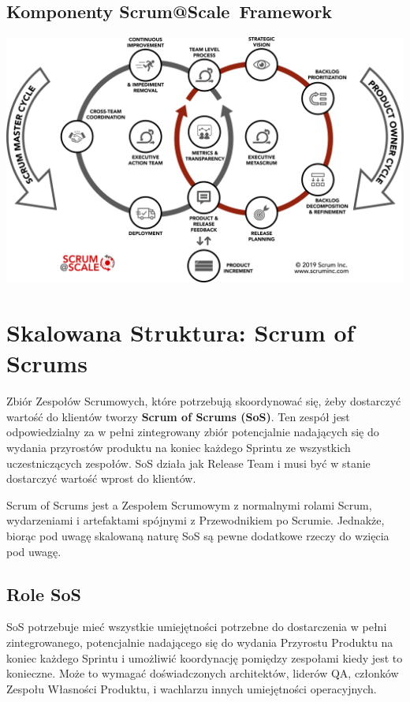 \documentclass[12pt,a4paper,parskip=full]{scrartcl}
\begin{document}
\subsection{Komponenty Scrum@Scale\textregistered ~Framework}

\includegraphics[width=1.0\linewidth]{SMPO-Cycle.png}

\section{Skalowana Struktura: Scrum of Scrums}

Zbiór Zespołów Scrumowych, które potrzebują skoordynować się, żeby dostarczyć wartość do klientów tworzy \textbf{Scrum of Scrums (SoS)}. Ten zespół jest odpowiedzialny za w pełni zintegrowany zbiór potencjalnie nadających się do wydania przyrostów produktu na koniec każdego Sprintu ze wszystkich uczestniczących zespołów. SoS działa jak Release Team i musi być w stanie dostarczyć wartość wprost do klientów.

Scrum of Scrums jest a Zespołem Scrumowym z normalnymi rolami Scrum, wydarzeniami i artefaktami spójnymi z Przewodnikiem po Scrumie. Jednakże, biorąc pod uwagę skalowaną naturę SoS są pewne dodatkowe rzeczy do wzięcia pod uwagę.

\subsection{Role SoS}

SoS potrzebuje mieć wszystkie umiejętności potrzebne do dostarczenia w pełni zintegrowanego, potencjalnie nadającego się do wydania Przyrostu Produktu na koniec każdego Sprintu i umożliwić koordynację pomiędzy zespołami kiedy jest to konieczne. Może to wymagać doświadczonych architektów, liderów QA, członków Zespołu Własności Produktu, i wachlarzu innych umiejętności operacyjnych.
\end{document}
